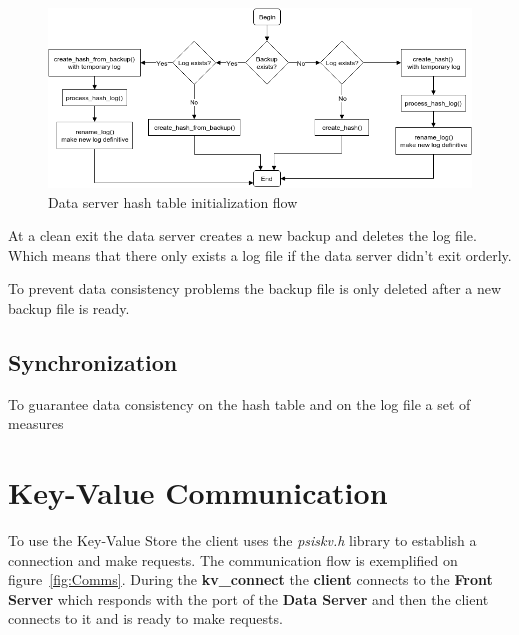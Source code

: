 \documentclass[12pt]{article} %
\begin{document}
\begin{figure}[H]
\centering
\includegraphics[width=\textwidth]{./Pictures/BackupLogFlow.png}
\caption{Data server hash table initialization flow}\label{fig:BackupLogFlow}
\end{figure}

At a clean exit the data server creates a new backup and deletes the log file. Which means that there only exists a log file if the data server didn't exit orderly.

To prevent data consistency problems the backup file is only deleted after a new backup file is ready.



\subsection{Synchronization}
\label{sub:Synchronization}

To guarantee data consistency on the hash table and on the log file a set of measures


\section{Key-Value Communication}

To use the Key-Value Store the client uses the \emph{psiskv.h} library to establish a connection and make requests.
The communication flow is exemplified on figure~\ref{fig:Comms}. During the \textbf{kv\_connect} the \textbf{client} connects to the \textbf{Front Server} which responds with the port of the \textbf{Data Server} and then the client connects to it and is ready to make requests.
\end{document}
